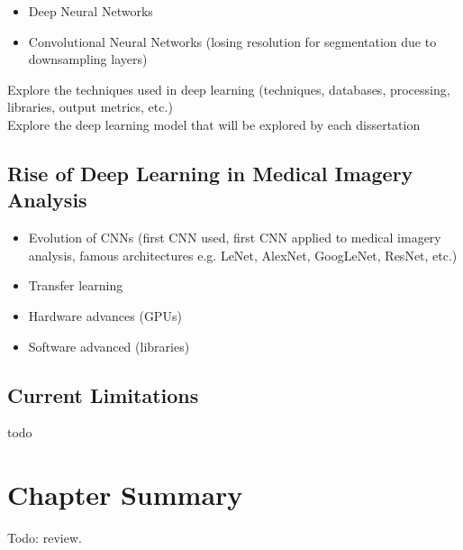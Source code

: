 \begin{itemize}
    \item Deep Neural Networks
    \item Convolutional Neural Networks (losing resolution for segmentation due to downsampling layers)
\end{itemize}

Explore the techniques used in deep learning (techniques, databases, processing, libraries, output metrics, etc.)\\
Explore the deep learning model that will be explored by each dissertation

\subsection{Rise of Deep Learning in Medical Imagery Analysis}

\begin{itemize}
    \item Evolution of CNNs (first CNN used, first CNN applied to medical imagery analysis, famous architectures e.g. LeNet, AlexNet, GoogLeNet, ResNet, etc.)
    \item Transfer learning
    \item Hardware advances (GPUs)
    \item Software advanced (libraries)
\end{itemize}

\subsection{Current Limitations}

todo


\section{Chapter Summary}

Todo: review.
